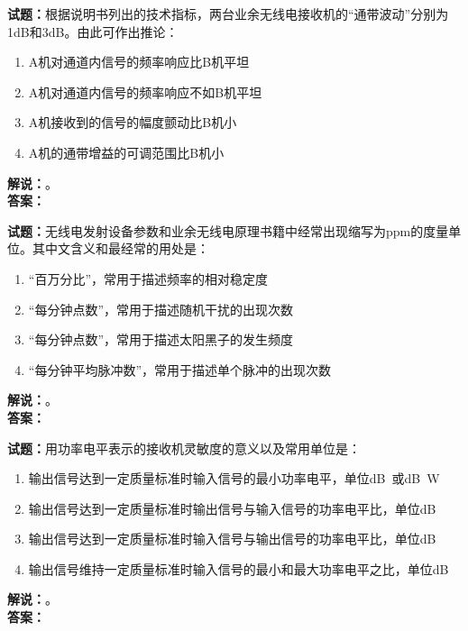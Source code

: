 \documentclass{ctexbook}
\begin{document}
\bigskip

\noindent\textbf{试题：}根据说明书列出的技术指标，两台业余无线电接收机的“通带波动”分别为1dB和3dB。由此可作出推论：
\begin{enumerate}[leftmargin=3em]
  \item A机对通道内信号的频率响应比B机平坦
  \item A机对通道内信号的频率响应不如B机平坦
  \item A机接收到的信号的幅度颤动比B机小
  \item A机的通带增益的可调范围比B机小
\end{enumerate}
\noindent\textbf{解说：}\textbf{}。\\\noindent\textbf{答案：}

\bigskip

\noindent\textbf{试题：}无线电发射设备参数和业余无线电原理书籍中经常出现缩写为ppm的度量单位。其中文含义和最经常的用处是：
\begin{enumerate}[leftmargin=3em]
  \item “百万分比”，常用于描述频率的相对稳定度
  \item “每分钟点数”，常用于描述随机干扰的出现次数
  \item “每分钟点数”，常用于描述太阳黑子的发生频度
  \item “每分钟平均脉冲数”，常用于描述单个脉冲的出现次数
\end{enumerate}
\noindent\textbf{解说：}\textbf{}。\\\noindent\textbf{答案：}

\bigskip

\noindent\textbf{试题：}用功率电平表示的接收机灵敏度的意义以及常用单位是：
\begin{enumerate}[leftmargin=3em]
  \item 输出信号达到一定质量标准时输入信号的最小功率电平，单位\unit[qualifier-mode=combine]{\deci\bel{}}或\unit[qualifier-mode=combine]{\deci\bel{}}W
  \item 输出信号达到一定质量标准时输出信号与输入信号的功率电平比，单位dB
  \item 输出信号达到一定质量标准时输入信号与输出信号的功率电平比，单位dB
  \item 输出信号维持一定质量标准时输入信号的最小和最大功率电平之比，单位dB
\end{enumerate}
\noindent\textbf{解说：}\textbf{}。\\\noindent\textbf{答案：}

\bigskip
\end{document}
